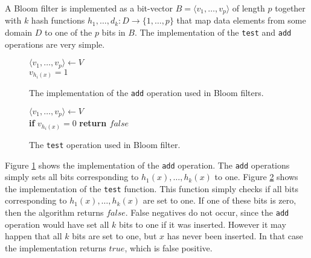 A Bloom filter is implemented as a bit-vector $B = \langle v_1, \dots, v_p \rangle$ of length $p$ together with $k$ hash functions $h_1, \dots, d_k : D \rightarrow \{ 1, \dots, p \}$ that map data elements from some domain $D$ to one of the $p$ bits in $B$. The implementation of the \texttt{test} and \texttt{add} operations are very simple.

\begin{figure}
	\centering
	\begin{algorithm}[H]
		\SetStartEndCondition{ }{}{}%
		\AlgoDontDisplayBlockMarkers\SetAlgoNoEnd\SetAlgoNoLine%
		
		 {
			$\langle v_1, \dots, v_p \rangle \gets V$ \\
			 {
				$v_{h_i(x)} = 1$
			}
		}
	\end{algorithm}

	\caption{The implementation of the \texttt{add} operation used in Bloom filters.}
	\label{fig:bloom_add}
\end{figure}

\begin{figure}
	\centering
	\begin{algorithm}[H]
		\SetStartEndCondition{ }{}{}%
		\AlgoDontDisplayBlockMarkers\SetAlgoNoEnd\SetAlgoNoLine%

		 {
			$\langle v_1, \dots, v_p \rangle \gets V$ \\
			 {
				\textbf{if} $v_{h_i(x)} = 0$ \textbf{return $false$}
			}
		}
	\end{algorithm}

	\caption{The \texttt{test} operation used in Bloom filter.}
	\label{fig:bloom_test}
\end{figure}

Figure \ref{fig:bloom_add} shows the implementation of the \texttt{add} operation. The \texttt{add} operations simply sets all bits corresponding to $h_1(x), \dots, h_k(x)$ to one. Figure \ref{fig:bloom_test} shows the implementation of the \texttt{test} function. This function simply checks if 
all bits corresponding to $h_1(x), \dots, h_k(x)$ are set to one. If one of these bits is zero, then the algorithm returns $false$. False negatives do not occur, since the \texttt{add} operation would have set all $k$ bits to one if it was inserted. However it may happen that all $k$ bits are set to one, but $x$ has never been inserted. In that case the implementation returns $true$, which is false positive.

